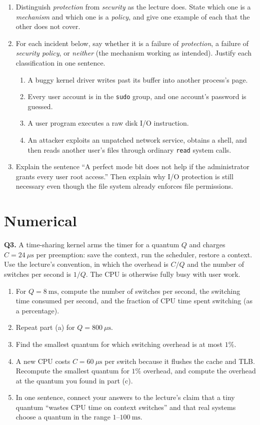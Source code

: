 \documentclass[11pt]{article}
\begin{document}
\begin{enumerate}
  \item[(a)] Distinguish \emph{protection} from \emph{security} as the lecture does. State which one is a \emph{mechanism} and which one is a \emph{policy}, and give one example of each that the other does not cover.
  \item[(b)] For each incident below, say whether it is a failure of \emph{protection}, a failure of \emph{security policy}, or \emph{neither} (the mechanism working as intended). Justify each classification in one sentence.
    \begin{enumerate}
      \item[(i)] A buggy kernel driver writes past its buffer into another process's page.
      \item[(ii)] Every user account is in the \texttt{sudo} group, and one account's password is guessed.
      \item[(iii)] A user program executes a raw disk I/O instruction.
      \item[(iv)] An attacker exploits an unpatched network service, obtains a shell, and then reads another user's files through ordinary \texttt{read} system calls.
    \end{enumerate}
  \item[(c)] Explain the sentence ``A perfect mode bit does not help if the administrator grants every user root access.'' Then explain why I/O protection is still necessary even though the file system already enforces file permissions.
\end{enumerate}

\section{Numerical}

\textbf{Q3.} A time-sharing kernel arms the timer for a quantum $Q$ and charges $C = 24\ \mu\text{s}$ per preemption: save the context, run the scheduler, restore a context. Use the lecture's convention, in which the overhead is $C/Q$ and the number of switches per second is $1/Q$. The CPU is otherwise fully busy with user work.

\begin{enumerate}
  \item[(a)] For $Q = 8\ \text{ms}$, compute the number of switches per second, the switching time consumed per second, and the fraction of CPU time spent switching (as a percentage).
  \item[(b)] Repeat part (a) for $Q = 800\ \mu\text{s}$.
  \item[(c)] Find the smallest quantum for which switching overhead is at most $1\%$.
  \item[(d)] A new CPU costs $C = 60\ \mu\text{s}$ per switch because it flushes the cache and TLB. Recompute the smallest quantum for $1\%$ overhead, and compute the overhead at the quantum you found in part (c).
  \item[(e)] In one sentence, connect your answers to the lecture's claim that a tiny quantum ``wastes CPU time on context switches'' and that real systems choose a quantum in the range $1$--$100\ \text{ms}$.
\end{enumerate}
\end{document}
